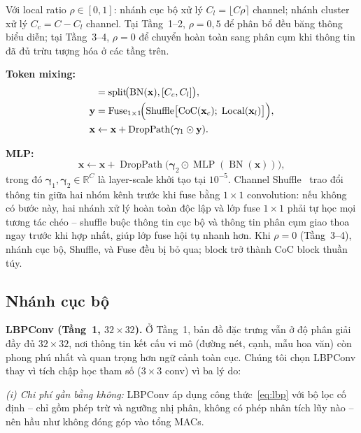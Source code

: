 \documentclass[conference]{IEEEtran}
\begin{document}
Với local ratio $\rho\in[0,1]$: nhánh cục bộ xử lý $C_l{=}\lfloor C\rho\rceil$
channel; nhánh cluster xử lý $C_c{=}C-C_l$ channel. Tại Tầng~1--2,
$\rho{=}0{,}5$ để phân bổ đều băng thông biểu diễn; tại Tầng~3--4,
$\rho{=}0$ để chuyển hoàn toàn sang phân cụm khi thông tin đã đủ
trừu tượng hóa ở các tầng trên.

\noindent\textbf{Token mixing:}
\begin{align}
  [\mathbf{x}_c;\,\mathbf{x}_l] &=
    \operatorname{split}\!\bigl(\operatorname{BN}(\mathbf{x}),[C_c,C_l]\bigr),
  \label{eq:split}\\
  \mathbf{y} &= \operatorname{Fuse}_{1\times1}\!\Bigl(
    \operatorname{Shuffle}\bigl[\operatorname{CoC}(\mathbf{x}_c);\;
    \operatorname{Local}(\mathbf{x}_l)\bigr]\Bigr),
  \label{eq:mix}\\
  \mathbf{x} &\leftarrow \mathbf{x}+
    \operatorname{DropPath}(\bm{\gamma}_1\odot\mathbf{y}).
  \label{eq:skip1}
\end{align}

\noindent\textbf{MLP:}
\begin{equation}
  \mathbf{x}\leftarrow\mathbf{x}+
  \operatorname{DropPath}\!\bigl(
    \bm{\gamma}_2\odot\operatorname{MLP}(\operatorname{BN}(\mathbf{x}))\bigr),
  \label{eq:skip2}
\end{equation}
trong đó $\bm{\gamma}_1,\bm{\gamma}_2\in\mathbb{R}^C$ là layer-scale
khởi tạo tại $10^{-5}$. Channel Shuffle~\cite{Ma2018ShuffleNetV2}
trao đổi thông tin giữa hai nhóm kênh trước khi fuse bằng
$1\!\times\!1$ convolution: nếu không có bước này, hai nhánh xử lý
hoàn toàn độc lập và lớp fuse $1\!\times\!1$ phải tự học mọi tương
tác chéo -- shuffle buộc thông tin cục bộ và thông tin phân cụm
giao thoa ngay trước khi hợp nhất, giúp lớp fuse hội tụ nhanh hơn.
Khi $\rho{=}0$ (Tầng~3--4), nhánh cục bộ, Shuffle, và Fuse đều bị
bỏ qua; block trở thành CoC block thuần túy.


\subsection{Nhánh cục bộ}
\label{ssec:local}

\noindent\textbf{LBPConv (Tầng~1, $32\!\times\!32$).}
Ở Tầng~1, bản đồ đặc trưng vẫn ở độ phân giải đầy đủ $32\!\times\!32$,
nơi thông tin kết cấu vi mô (đường nét, cạnh, mẫu hoa văn) còn phong
phú nhất và quan trọng hơn ngữ cảnh toàn cục. Chúng tôi chọn LBPConv
thay vì tích chập học tham số ($3\!\times\!3$ conv) vì ba lý do:

\textit{(i) Chi phí gần bằng không:} LBPConv áp dụng
công thức~\eqref{eq:lbp} với bộ lọc cố định -- chỉ gồm phép trừ và
ngưỡng nhị phân, không có phép nhân tích lũy nào -- nên hầu như không
đóng góp vào tổng MACs.
\end{document}
